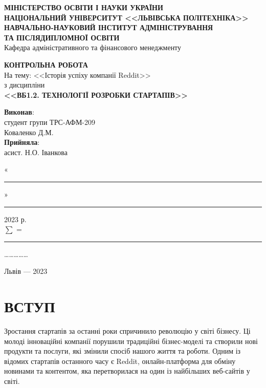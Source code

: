 \documentclass[oneside,14pt]{extarticle}
\begin{document}
\begin{titlepage}
	\begin{center}
		\textbf{МІНІСТЕРСТВО ОСВІТИ І НАУКИ УКРАЇНИ\\
		НАЦІОНАЛЬНИЙ УНІВЕРСИТУТ <<ЛЬВІВСЬКА ПОЛІТЕХНІКА>>\\
		НАВЧАЛЬНО-НАУКОВИЙ ІНСТИТУТ АДМІНІСТРУВАННЯ\\
		ТА ПІСЛЯДИПЛОМНОЇ ОСВІТИ\\}
		Кафедра адміністративного та фінансового менеджменту

		
		\vspace{130pt}
		\textbf{КОНТРОЛЬНА РОБОТА}\\
		На тему:
		<<Історія успіху компанії Reddit>>\\
		з дисципліни\\
		\textbf{<<ВБ1.2. ТЕХНОЛОГІЇ РОЗРОБКИ СТАРТАПІВ>>}
		\vspace*{40pt}
		
		\begin{flushright}
			\textbf{Виконав}:\\
			
			студент групи ТРС-АФМ-209\\
			Коваленко Д.М.\\
			\vspace{10pt}
			\textbf{Прийняла}:\\
			асист. Н.О. Іванкова
			
			\vspace{28pt}
			«\rule{1cm}{0.15mm}» \rule{1.5cm}{0.15mm} 2023 р.\\
			$\sum$ = \rule{1cm}{0.15mm}……………\\
			
		\end{flushright}
		\vspace{\fill}
		Львів — 2023
	\end{center}
\end{titlepage}
\setcounter{page}{2}
\tableofcontents
\newpage

\section*{ВСТУП}

Зростання стартапів за останні роки спричинило революцію у світі бізнесу. Ці молоді інноваційні компанії порушили традиційні бізнес-моделі та створили нові продукти та послуги, які змінили спосіб нашого життя та роботи. Одним із відомих стартапів останного часу є Reddit, онлайн-платформа для обміну новинами та контентом, яка перетворилася на один із найбільших веб-сайтів у світі.
\end{document}
